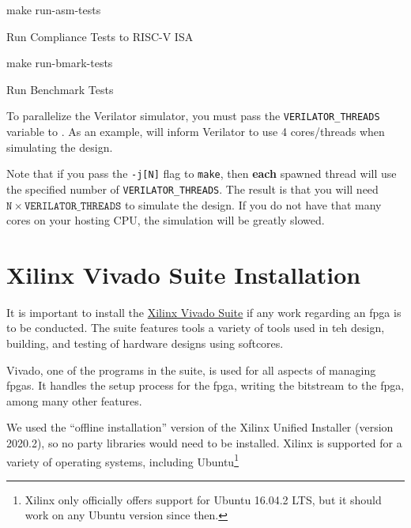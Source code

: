 \begin{listing}[h!tbp]
\begin{bashsource}
make run-asm-tests
\end{bashsource}
\caption{Run Compliance Tests to RISC-V ISA}
\label{lst:ASM_Tests}
\end{listing}

\begin{listing}[h!tbp]
\begin{bashsource}
make run-bmark-tests
\end{bashsource}
\caption{Run Benchmark Tests}
\label{lst:Run_Benchmark_Tests}
\end{listing}

\begin{blackbox}
  To parallelize the Verilator simulator, you must pass the \texttt{VERILATOR\_THREADS} variable to .
  As an example,  will inform Verilator to use 4 cores/threads when simulating the design.

  Note that if you pass the \texttt{-j[N]} flag to \texttt{make}, then \textbf{each} spawned thread will use the specified number of \texttt{VERILATOR\_THREADS}.
  The result is that you will need $\mathtt{N} \times \mathtt{VERILATOR\_THREADS}$ to simulate the design.
  If you do not have that many cores on your hosting CPU, the simulation will be greatly slowed.
\end{blackbox}

\section{Xilinx Vivado Suite Installation}\label{sec:Xilinx_Vivado_Suide_Install}
It is important to install the \href{https://www.xilinx.com/support/download.html}{Xilinx Vivado Suite} if any work regarding an \Gls{fpga} is to be conducted.
The suite features tools a variety of tools used in teh design, building, and testing of hardware designs using \glspl{softcore}.

Vivado, one of the programs in the suite, is used for all aspects of managing \Glspl{fpga}.
It handles the setup process for the \Gls{fpga}, writing the bitstream to the \Gls{fpga}, among many other features.

We used the ``offline installation'' version of the Xilinx Unified Installer (version 2020.2), so no  party libraries would need to be installed.
Xilinx is supported for a variety of operating systems, including Ubuntu\footnote{Xilinx only officially offers support for Ubuntu 16.04.2 LTS, but it should work on any Ubuntu version since then.}

